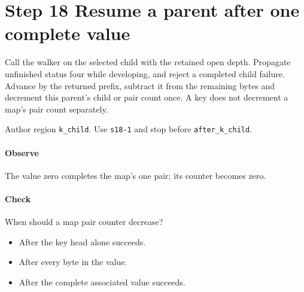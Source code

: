\section{Step 18 Resume a parent after one complete value}\label{cbor-s18}
Call the walker on the selected child with the retained open depth. Propagate unfinished status four while developing, and reject a completed child failure. Advance by the returned prefix, subtract it from the remaining bytes and decrement this parent's child or pair count once. A key does not decrement a map's pair count separately.

Author region \texttt{k\_child}. Use \texttt{s18-1} and stop before \texttt{after\_k\_child}.

\paragraph{Observe} The value zero completes the map's one pair; its counter becomes zero.

\paragraph{Check} When should a map pair counter decrease?
\begin{itemize}
\item[A.] After the key head alone succeeds.
\item[B.] After every byte in the value.
\item[C.] After the complete associated value succeeds.
\end{itemize}
